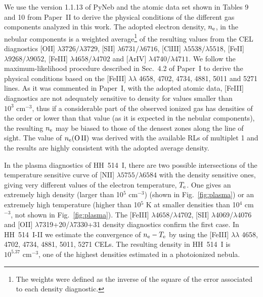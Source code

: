\documentclass[fleqn,usenatbib]{mnras}
\begin{document}
We use the version 1.1.13 of PyNeb \citep{Luridiana15} and the atomic data set shown in Tables 9 and 10 from Paper~II to derive the physical conditions of the different gas  components analyzed in this work. The adopted electron density, $n_{\rm e}$, in the nebular components is a weighted average\footnote{The weights were defined as the inverse of the square of the error associated to each density diagnostic.} of the resulting values from the CEL diagnostics
[O\thinspace II] $\lambda3726/\lambda3729$, [S\thinspace II] $\lambda6731/\lambda6716$, [Cl\thinspace III] $\lambda5538/\lambda5518$, [Fe\thinspace II] $\lambda9268/\lambda9052$, [Fe\thinspace III] $\lambda4658/\lambda4702$ and [Ar\thinspace IV]  $\lambda4740/\lambda4711$.  We follow the maximum-likelihood procedure described in Sec.~4.2 of Paper~I to derive the physical conditions based on the [Fe\thinspace III] $\lambda \lambda $ 4658, 4702, 4734, 4881, 5011 and 5271 lines. As it was commented in Paper~I, with the adopted atomic data, [Fe\thinspace III] diagnostics are not adequately sensitive to density for values smaller than $10^{3} \text{ cm}^{-3}$, thus if a considerable part of the observed ionized gas has densities of the order or lower than that value (as it is expected in the nebular components), the resulting $n_{\rm e}$ may be biased to those of the densest zones along the line of sight. The value of $n_{\rm e}(\text{O\thinspace II})$ was derived with the available RLs of multiplet 1 and the results are highly consistent with the adopted average density.

In the plasma diagnostics of HH~514~I, there are two possible intersections of the temperature sensitive curve of [N\thinspace II] $\lambda5755/\lambda6584$ with the density sensitive ones, giving very different values of the electron temperature,  $T_{\rm e}$. One gives an extremely high density (larger than 10$^5$ cm$^{-3}$) (shown in Fig.~\ref{fig:plasma}) or an extremely high temperature (higher than 10$^{5}$ K at smaller densities than 10$^{4}$ cm$^{-3}$, not shown in Fig.~\ref{fig:plasma}). The [Fe\thinspace III] $\lambda4658/\lambda4702$, [S\thinspace II] $\lambda$4069/$\lambda$4076 and [O\thinspace II] $\lambda$7319+20/$\lambda$7330+31 density diagnostics confirm the first case. In HH~514~I-II we estimate the convergence of $n_{\rm e}-T_{\rm e}$ by using the [Fe\thinspace III] $\lambda \lambda$ 4658, 4702, 4734, 4881, 5011, 5271 CELs. The resulting density in  HH~514~I is $10^{5.37} \text{ cm}^{-3}$, one of the highest densities estimated in a photoionized nebula. 
\end{document}
